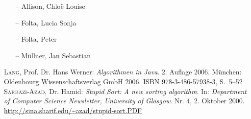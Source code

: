 \documentclass[german]{pfBook}
\begin{document}
	\begin{itemize}
		\item[--] Allison, Chlo\"{e} Louise
		\item[--] Folta, Lucia Sonja
		\item[--] Folta, Peter
		\item[--] M\"{u}llner, Jan Sebastian
	\end{itemize}
	
	\begin{thebibliography}{99}
			\textsc{Lang}, Prof. Dr. Hans Werner: \emph{Algorithmen in Java}. 2. Auflage 2006. München: Oldenbourg Wissenschaftsverlag GmbH 2006. ISBN 978-3-486-57938-3, S.~5--52
			\textsc{Sarbazi-Azad}, Dr. Hamid: \emph{Stupid Sort: A new sorting algorithm}. In: \emph{Department of Computer Science Newsletter, University of Glasgow}. Nr. 4, 2. Oktober 2000. \href{http://sina.sharif.edu/~azad/stupid-sort.PDF}{http://sina.sharif.edu/\~{}azad/stupid-sort.PDF}
	\end{thebibliography}
	
	\makelistoffigures
	\makelistoflistings
\end{document}
